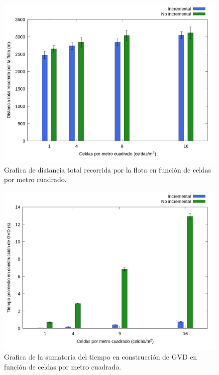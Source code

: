 \begin{figure}[H]
  \centerfloat

  \includegraphics[clip=true, width=\graphlen]{imagenes/graficas_chicas/graficas_histo_num/incrementalidad/exploration_cost.png}

  \caption{Grafica de distancia total recorrida por la flota  en función de celdas por metro cuadrado.}\label{fig:gra:inc:ec}

\end{figure}

\begin{figure}[H]
  \centerfloat

  \includegraphics[clip=true, width=\graphlen]{imagenes/graficas_chicas/graficas_histo_num/incrementalidad/gvd_construction_time_mean.png}

  \caption{Grafica de la sumatoria del tiempo en construcción de GVD en función de celdas por metro cuadrado.}\label{fig:gra:inc:gvdt}

\end{figure}



